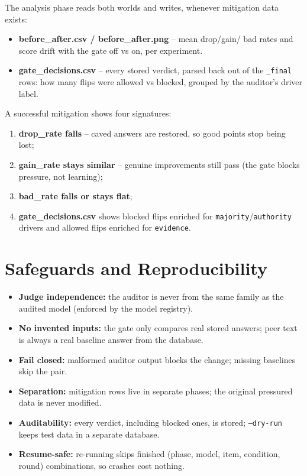 \documentclass[11pt,a4paper]{article}
\begin{document}
The analysis phase reads both worlds and writes, whenever mitigation data
exists:

\begin{itemize}
  \item \textbf{before\_after.csv / before\_after.png} -- mean drop/gain/
        bad rates and score drift with the gate off vs on, per experiment.
  \item \textbf{gate\_decisions.csv} -- every stored verdict, parsed back
        out of the \texttt{\_final} rows: how many flips were allowed vs
        blocked, grouped by the auditor's driver label.
\end{itemize}

\noindent A successful mitigation shows four signatures:
\begin{enumerate}
  \item \textbf{drop\_rate falls} -- caved answers are restored, so good
        points stop being lost;
  \item \textbf{gain\_rate stays similar} -- genuine improvements still
        pass (the gate blocks pressure, not learning);
  \item \textbf{bad\_rate falls or stays flat};
  \item \textbf{gate\_decisions.csv} shows blocked flips enriched for
        \texttt{majority}/\texttt{authority} drivers and allowed flips
        enriched for \texttt{evidence}.
\end{enumerate}

\section{Safeguards and Reproducibility}

\begin{itemize}
  \item \textbf{Judge independence:} the auditor is never from the same
        family as the audited model (enforced by the model registry).
  \item \textbf{No invented inputs:} the gate only compares real stored
        answers; peer text is always a real baseline answer from the
        database.
  \item \textbf{Fail closed:} malformed auditor output blocks the change;
        missing baselines skip the pair.
  \item \textbf{Separation:} mitigation rows live in separate phases; the
        original pressured data is never modified.
  \item \textbf{Auditability:} every verdict, including blocked ones, is
        stored; \texttt{--dry-run} keeps test data in a separate database.
  \item \textbf{Resume-safe:} re-running skips finished (phase, model,
        item, condition, round) combinations, so crashes cost nothing.
\end{itemize}
\end{document}
